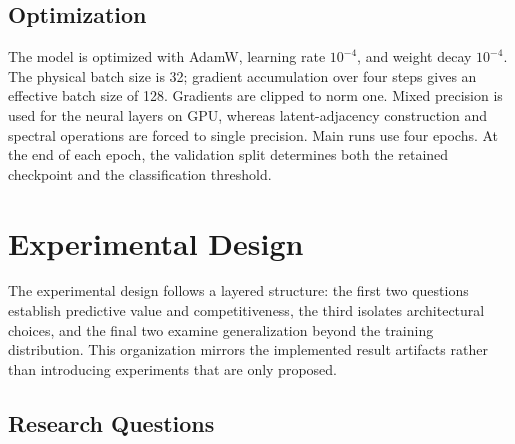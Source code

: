 \documentclass[authoryear,final,5p,times,twocolumn]{elsarticle}
\newcommand{\added}[1]{{\color{green!50!black}#1}}
\theoremstyle{plain}
\begin{document}
\subsection{Optimization}
\label{sec:optimization}

The model is optimized with AdamW, learning rate $10^{-4}$, and weight decay
$10^{-4}$. The physical batch size is 32; gradient accumulation over four
steps gives an effective batch size of 128. \added{Gradients are clipped to norm one.}
Mixed precision is used for the neural layers on GPU, whereas latent-adjacency
construction and spectral operations are forced to single precision. Main runs
use four epochs. At the end of each epoch, the validation split determines both
the retained checkpoint and the classification threshold.


\section{Experimental Design}
\label{sec:experimental_design}

\added{The experimental design follows a layered structure: the first two questions
establish predictive value and competitiveness, the third isolates architectural
choices, and the final two examine generalization beyond the training distribution.
This organization mirrors the implemented result artifacts rather than introducing
experiments that are only proposed.}

\subsection{Research Questions}
\label{sec:research_questions}
\end{document}
